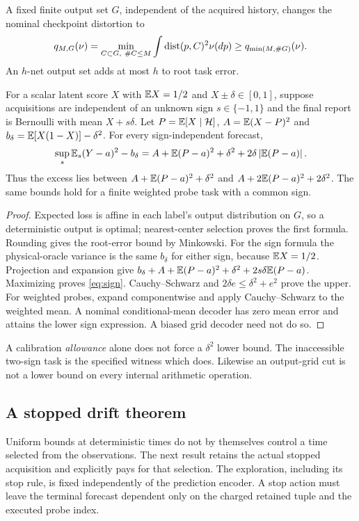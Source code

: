 \begin{proposition}\label{prop:calibration}
A fixed finite output set $G$, independent of the acquired history, changes the nominal checkpoint distortion to
\[
 q_{M,G}(\nu)=\min_{C\subset G,\ \#C\le M}\int\operatorname{dist}(p,C)^2\nu(dp)
 \ge q_{\min(M,\#G)}(\nu).
\]
An $h$-net output set adds at most $h$ to root task error.

For a scalar latent score $X$ with $\mathbb E X=1/2$ and $X\pm\delta\in[0,1]$, suppose acquisitions are independent of an unknown sign $s\in\{-1,1\}$ and the final report is Bernoulli with mean $X+s\delta$. Let $P=\mathbb E[X\mid\mathcal H]$, $A=\mathbb E(X-P)^2$ and $b_\delta=\mathbb E[X(1-X)]-\delta^2$. For every sign-independent forecast,
\begin{equation}\label{eq:sign}
 \sup_s\mathbb E_s(Y-a)^2-b_\delta
 =A+\mathbb E(P-a)^2+\delta^2+2\delta\left\lvert\mathbb E(P-a)\right\rvert.
\end{equation}
Thus the excess lies between $A+\mathbb E(P-a)^2+\delta^2$ and $A+2\mathbb E(P-a)^2+2\delta^2$. The same bounds hold for a finite weighted probe task with a common sign.
\end{proposition}
\begin{proof}
Expected loss is affine in each label's output distribution on $G$, so a deterministic output is optimal; nearest-center selection proves the first formula. Rounding gives the root-error bound by Minkowski. For the sign formula the physical-oracle variance is the same $b_\delta$ for either sign, because $\mathbb E X=1/2$. Projection and expansion give
$b_\delta+A+\mathbb E(P-a)^2+\delta^2+2s\delta\mathbb E(P-a)$.
Maximizing proves \eqref{eq:sign}. Cauchy--Schwarz and $2\delta e\le\delta^2+e^2$ prove the upper. For weighted probes, expand componentwise and apply Cauchy--Schwarz to the weighted mean. A nominal conditional-mean decoder has zero mean error and attains the lower sign expression. A biased grid decoder need not do so.
\end{proof}

A calibration \emph{allowance} alone does not force a $\delta^2$ lower bound. The inaccessible two-sign task is the specified witness which does. Likewise an output-grid cut is not a lower bound on every internal arithmetic operation.

\subsection{A stopped drift theorem}
Uniform bounds at deterministic times do not by themselves control a time selected from the observations. The next result retains the actual stopped acquisition and explicitly pays for that selection. The exploration, including its stop rule, is fixed independently of the prediction encoder. A stop action must leave the terminal forecast dependent only on the charged retained tuple and the executed probe index.

